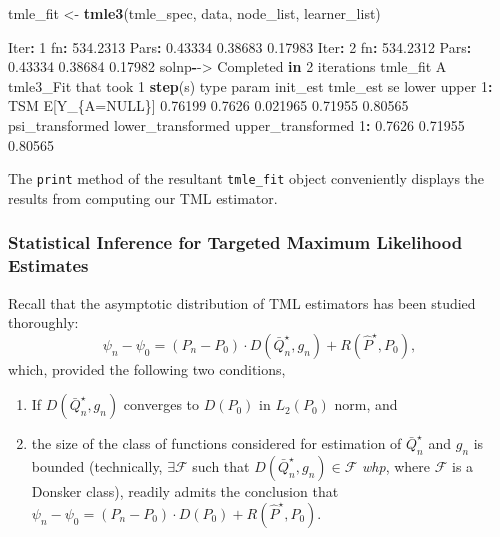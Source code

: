 \documentclass[12pt, krantz2,]{krantz}
\newenvironment{Shaded}{\begin{snugshade}}{\end{snugshade}}
\newcommand{\ControlFlowTok}[1]{\textcolor[rgb]{0.27,0.27,0.27}{\textbf{#1}}}
\newcommand{\DecValTok}[1]{\textcolor[rgb]{0.06,0.06,0.06}{#1}}
\newcommand{\FloatTok}[1]{\textcolor[rgb]{0.06,0.06,0.06}{#1}}
\newcommand{\KeywordTok}[1]{\textcolor[rgb]{0.27,0.27,0.27}{\textbf{#1}}}
\newcommand{\NormalTok}[1]{#1}
\newcommand{\OperatorTok}[1]{\textcolor[rgb]{0.43,0.43,0.43}{\textbf{#1}}}
\newcommand{\OtherTok}[1]{\textcolor[rgb]{0.37,0.37,0.37}{#1}}
\newcommand{\StringTok}[1]{\textcolor[rgb]{0.5,0.5,0.5}{#1}}
\providecommand{\tightlist}{%
  \setlength{\itemsep}{0pt}\setlength{\parskip}{0pt}}
\theoremstyle{definition}
\theoremstyle{definition}
\theoremstyle{definition}
\newcommand{\1}{\mathbbm{1}}
\begin{document}
\begin{Shaded}
\begin{Highlighting}[]
\NormalTok{tmle_fit <-}\StringTok{ }\KeywordTok{tmle3}\NormalTok{(tmle_spec, data, node_list, learner_list)}

\NormalTok{Iter}\OperatorTok{:}\StringTok{ }\DecValTok{1}\NormalTok{ fn}\OperatorTok{:}\StringTok{ }\FloatTok{534.2313}\NormalTok{     Pars}\OperatorTok{:}\StringTok{  }\FloatTok{0.43334} \FloatTok{0.38683} \FloatTok{0.17983}
\NormalTok{Iter}\OperatorTok{:}\StringTok{ }\DecValTok{2}\NormalTok{ fn}\OperatorTok{:}\StringTok{ }\FloatTok{534.2312}\NormalTok{     Pars}\OperatorTok{:}\StringTok{  }\FloatTok{0.43334} \FloatTok{0.38684} \FloatTok{0.17982}
\NormalTok{solnp}\OperatorTok{-}\NormalTok{->}\StringTok{ }\NormalTok{Completed }\ControlFlowTok{in} \DecValTok{2}\NormalTok{ iterations}
\NormalTok{tmle_fit}
\NormalTok{A tmle3_Fit that took }\DecValTok{1} \KeywordTok{step}\NormalTok{(s)}
\NormalTok{   type         param init_est tmle_est       se   lower   upper}
\DecValTok{1}\OperatorTok{:}\StringTok{  }\NormalTok{TSM E[Y_\{A=}\OtherTok{NULL}\NormalTok{\}]  }\FloatTok{0.76199}   \FloatTok{0.7626} \FloatTok{0.021965} \FloatTok{0.71955} \FloatTok{0.80565}
\NormalTok{   psi_transformed lower_transformed upper_transformed}
\DecValTok{1}\OperatorTok{:}\StringTok{          }\FloatTok{0.7626}           \FloatTok{0.71955}           \FloatTok{0.80565}
\end{Highlighting}
\end{Shaded}

The \texttt{print} method of the resultant \texttt{tmle\_fit} object conveniently displays the
results from computing our TML estimator.

\hypertarget{statistical-inference-for-targeted-maximum-likelihood-estimates}{%
\subsubsection{Statistical Inference for Targeted Maximum Likelihood Estimates}\label{statistical-inference-for-targeted-maximum-likelihood-estimates}}

Recall that the asymptotic distribution of TML estimators has been studied
thoroughly:
\[\psi_n - \psi_0 = (P_n - P_0) \cdot D(\bar{Q}_n^{\star}, g_n) +
R(\hat{P}^{\star}, P_0),\]
which, provided the following two conditions,

\begin{enumerate}
\def\labelenumi{\arabic{enumi}.}
\tightlist
\item
  If \(D(\bar{Q}_n^{\star}, g_n)\) converges to \(D(P_0)\) in \(L_2(P_0)\) norm, and
\item
  the size of the class of functions considered for estimation of
  \(\bar{Q}_n^{\star}\) and \(g_n\) is bounded (technically, \(\exists \mathcal{F}\)
  such that \(D(\bar{Q}_n^{\star}, g_n) \in \mathcal{F}\) \emph{whp}, where
  \(\mathcal{F}\) is a Donsker class),
  readily admits the conclusion that
  \(\psi_n - \psi_0 = (P_n - P_0) \cdot D(P_0) + R(\hat{P}^{\star}, P_0)\).
\end{enumerate}
\end{document}
